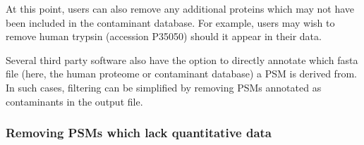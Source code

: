 \documentclass[9pt,a4paper,]{extarticle}
\newenvironment{Shaded}{\begin{snugshade}}{\end{snugshade}}
\newcommand{\ControlFlowTok}[1]{\textcolor[rgb]{0.13,0.29,0.53}{\textbf{#1}}}
\newcommand{\DecValTok}[1]{\textcolor[rgb]{0.00,0.00,0.81}{#1}}
\newcommand{\DocumentationTok}[1]{\textcolor[rgb]{0.56,0.35,0.01}{\textbf{\textit{#1}}}}
\newcommand{\FunctionTok}[1]{\textcolor[rgb]{0.13,0.29,0.53}{\textbf{#1}}}
\newcommand{\NormalTok}[1]{#1}
\newcommand{\OtherTok}[1]{\textcolor[rgb]{0.56,0.35,0.01}{#1}}
\newcommand{\SpecialCharTok}[1]{\textcolor[rgb]{0.81,0.36,0.00}{\textbf{#1}}}
\newcommand{\StringTok}[1]{\textcolor[rgb]{0.31,0.60,0.02}{#1}}
\begin{document}
\begin{Shaded}
\end{Shaded}

At this point, users can also remove any additional proteins which may not have
been included in the contaminant database. For example, users may wish to remove
human trypsin (accession P35050) should it appear in their data.

Several third party software also have the option to directly annotate which
fasta file (here, the human proteome or contaminant database) a PSM is derived
from. In such cases, filtering can be simplified by removing PSMs annotated as
contaminants in the output file.

\hypertarget{removing-psms-which-lack-quantitative-data}{%
\subsubsection{Removing PSMs which lack quantitative data}\label{removing-psms-which-lack-quantitative-data}}
\end{document}
